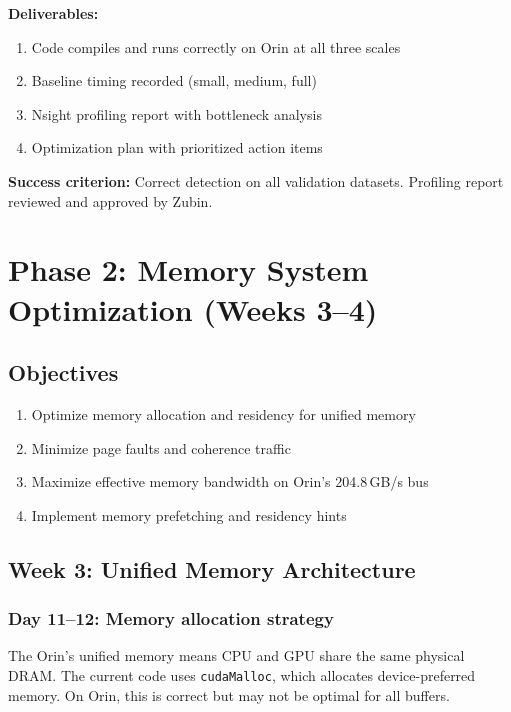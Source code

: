\documentclass[11pt,letterpaper]{article}
\begin{document}
\begin{milestonebox}
\textbf{Deliverables:}
\begin{enumerate}[leftmargin=2em]
    \item Code compiles and runs correctly on Orin at all three scales
    \item Baseline timing recorded (small, medium, full)
    \item Nsight profiling report with bottleneck analysis
    \item Optimization plan with prioritized action items
\end{enumerate}
\textbf{Success criterion:} Correct detection on all validation datasets.
Profiling report reviewed and approved by Zubin.
\end{milestonebox}

\section{Phase 2: Memory System Optimization (Weeks 3--4)}
\label{sec:phase2}

\subsection{Objectives}

\begin{enumerate}[leftmargin=2em]
    \item Optimize memory allocation and residency for unified memory
    \item Minimize page faults and coherence traffic
    \item Maximize effective memory bandwidth on Orin's 204.8\,GB/s bus
    \item Implement memory prefetching and residency hints
\end{enumerate}

\subsection{Week 3: Unified Memory Architecture}

\subsubsection{Day 11--12: Memory allocation strategy}

The Orin's unified memory means CPU and GPU share the same physical DRAM.
The current code uses \texttt{cudaMalloc}, which allocates device-preferred
memory. On Orin, this is correct but may not be optimal for all buffers.
\end{document}
